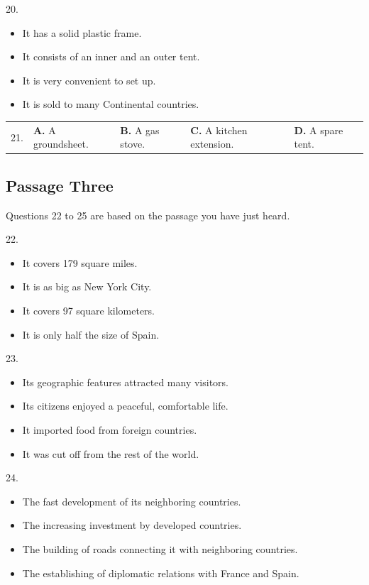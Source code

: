 \documentclass[UTF8,11pt]{ctexart}
\begin{document}
20.


\begin{itemize}[leftmargin=2em,itemsep=.2em,topsep=.4em]\item[A.] It has a solid plastic frame.
\item[B.] It consists of an inner and an outer tent.
\item[C.] It is very convenient to set up.
\item[D.] It is sold to many Continental countries.
\end{itemize}

\noindent\begin{tabularx}{\linewidth}{@{}lXXXX@{}}21. & \textbf{A.} A groundsheet. & \textbf{B.} A gas stove. & \textbf{C.} A kitchen extension. & \textbf{D.} A spare tent.\\\end{tabularx}\par

\subsection*{Passage Three}


Questions 22 to 25 are based on the passage you have just heard.


22.


\begin{itemize}[leftmargin=2em,itemsep=.2em,topsep=.4em]\item[A.] It covers 179 square miles.
\item[B.] It is as big as New York City.
\item[C.] It covers 97 square kilometers.
\item[D.] It is only half the size of Spain.
\end{itemize}

23.


\begin{itemize}[leftmargin=2em,itemsep=.2em,topsep=.4em]\item[A.] Its geographic features attracted many visitors.
\item[B.] Its citizens enjoyed a peaceful, comfortable life.
\item[C.] It imported food from foreign countries.
\item[D.] It was cut off from the rest of the world.
\end{itemize}

24.


\begin{itemize}[leftmargin=2em,itemsep=.2em,topsep=.4em]\item[A.] The fast development of its neighboring countries.
\item[B.] The increasing investment by developed countries.
\item[C.] The building of roads connecting it with neighboring countries.
\item[D.] The establishing of diplomatic relations with France and Spain.
\end{itemize}
\end{document}
